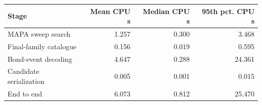 \begin{tabular}{@{}lrrr@{}}\toprule
Stage & Mean CPU s & Median CPU s & 95th pct. CPU s\\\midrule
MAPA sweep search & 1.257 & 0.300 & 3.468\\
Final-family catalogue & 0.156 & 0.019 & 0.595\\
Bond-event decoding & 4.647 & 0.288 & 24.361\\
Candidate serialization & 0.005 & 0.001 & 0.015\\
End to end & 6.073 & 0.812 & 25.470\\
\bottomrule\end{tabular}
